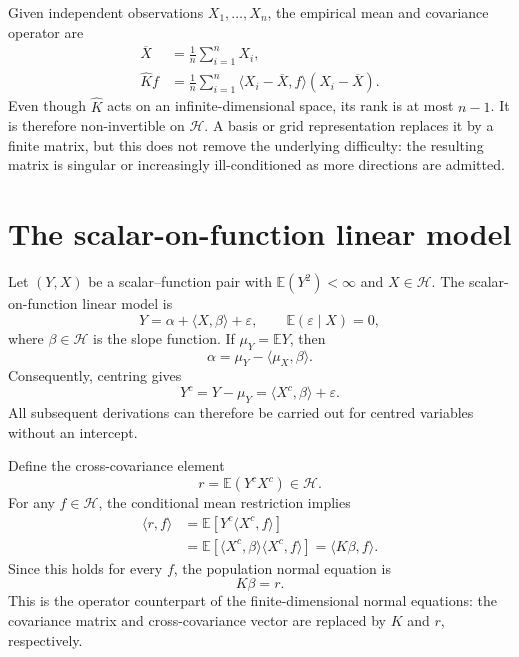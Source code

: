 Given independent observations $X_1,\ldots,X_n$, the empirical mean and covariance operator are
\begin{align}
    \overline X
    &=\frac1n\sum_{i=1}^{n}X_i,
    \label{eq:sample-functional-mean}\\
    \widehat K f
    &=\frac1n\sum_{i=1}^{n}
      \langle X_i-\overline X,f\rangle(X_i-\overline X).
    \label{eq:sample-covariance-operator}
\end{align}
Even though $\widehat K$ acts on an infinite-dimensional space, its rank is at most $n-1$. It is therefore non-invertible on $\mathcal H$. A basis or grid representation replaces it by a finite matrix, but this does not remove the underlying difficulty: the resulting matrix is singular or increasingly ill-conditioned as more directions are admitted.

\section{The scalar-on-function linear model}
\label{sec:scalar-on-function-model}

Let $(Y,X)$ be a scalar--function pair with $\mathbb E(Y^2)<\infty$ and $X\in\mathcal H$. The scalar-on-function linear model is
\begin{equation}
    Y=\alpha+\langle X,\beta\rangle+\varepsilon,
    \qquad
    \mathbb E(\varepsilon\mid X)=0,
    \label{eq:scalar-on-function-model}
\end{equation}
where $\beta\in\mathcal H$ is the slope function. If $\mu_Y=\mathbb EY$, then
\begin{equation}
    \alpha=\mu_Y-\langle\mu_X,\beta\rangle.
    \label{eq:functional-intercept}
\end{equation}
Consequently, centring gives
\begin{equation}
    Y^c=Y-\mu_Y=\langle X^c,\beta\rangle+\varepsilon.
    \label{eq:centered-functional-model}
\end{equation}
All subsequent derivations can therefore be carried out for centred variables without an intercept.

Define the cross-covariance element
\begin{equation}
    r=\mathbb E(Y^cX^c)\in\mathcal H.
    \label{eq:cross-covariance-element}
\end{equation}
For any $f\in\mathcal H$, the conditional mean restriction implies
\begin{align}
    \langle r,f\rangle
    &=\mathbb E\!\left[Y^c\langle X^c,f\rangle\right] \\
    &=\mathbb E\!\left[\langle X^c,\beta\rangle
                       \langle X^c,f\rangle\right]
      =\langle K\beta,f\rangle.
    \label{eq:normal-equation-weak}
\end{align}
Since this holds for every $f$, the population normal equation is
\begin{equation}
    K\beta=r.
    \label{eq:background-normal-equation}
\end{equation}
This is the operator counterpart of the finite-dimensional normal equations: the covariance matrix and cross-covariance vector are replaced by $K$ and $r$, respectively.

